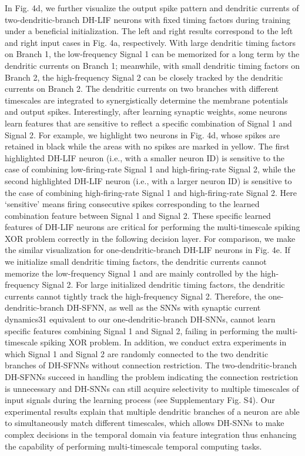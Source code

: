 In Fig. 4d, we further visualize the output spike pattern and dendritic currents of two-dendritic-branch DH-LIF neurons with fixed timing factors during training under a beneficial initialization. The left and right results correspond to the left and right input cases in Fig. 4a, respectively. With large dendritic timing factors on Branch 1, the low-frequency Signal 1 can be memorized for a long term by the dendritic currents on Branch 1; meanwhile, with small dendritic timing factors on Branch 2, the high-frequency Signal 2 can be closely tracked by the dendritic currents on Branch 2. The dendritic currents on two branches with different timescales are integrated to synergistically determine the membrane potentials and output spikes. Interestingly, after learning synaptic weights, some neurons learn features that are sensitive to reflect a specific combination of Signal 1 and Signal 2. For example, we highlight two neurons in Fig. 4d, whose spikes are retained in black while the areas with no spikes are marked in yellow. The first highlighted DH-LIF neuron (i.e., with a smaller neuron ID) is sensitive to the case of combining low-firing-rate Signal 1 and high-firing-rate Signal 2, while the second highlighted DH-LIF neuron (i.e., with a larger neuron ID) is sensitive to the case of combining high-firing-rate Signal 1 and high-firing-rate Signal 2. Here ‘sensitive’ means firing consecutive spikes corresponding to the learned combination feature between Signal 1 and Signal 2. These specific learned features of DH-LIF neurons are critical for performing the multi-timescale spiking XOR problem correctly in the following decision layer. For comparison, we make the similar visualization for one-dendritic-branch DH-LIF neurons in Fig. 4e. If we initialize small dendritic timing factors, the dendritic currents cannot memorize the low-frequency Signal 1 and are mainly controlled by the high-frequency Signal 2. For large initialized dendritic timing factors, the dendritic currents cannot tightly track the high-frequency Signal 2. Therefore, the one-dendritic-branch DH-SFNN, as well as the SNNs with synaptic current dynamics31 equivalent to our one-dendritic-branch DH-SNNs, cannot learn specific features combining Signal 1 and Signal 2, failing in performing the multi-timescale spiking XOR problem. In addition, we conduct extra experiments in which Signal 1 and Signal 2 are randomly connected to the two dendritic branches of DH-SFNNs without connection restriction. The two-dendritic-branch DH-SFNNs succeed in handling the problem indicating the connection restriction is unnecessary and DH-SNNs can still acquire selectivity to multiple timescales of input signals during the learning process (see Supplementary Fig. S4). Our experimental results explain that multiple dendritic branches of a neuron are able to simultaneously match different timescales, which allows DH-SNNs to make complex decisions in the temporal domain via feature integration thus enhancing the capability of performing multi-timescale temporal computing tasks.

